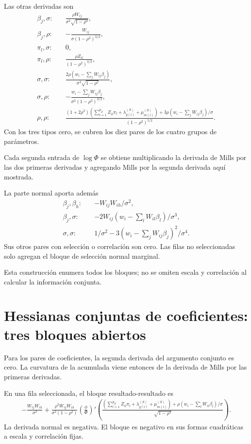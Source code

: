 \documentclass[11pt,a4paper]{article}
\begin{document}
Las otras derivadas son
\[
\begin{aligned}
\beta_j,\sigma:\quad&
\frac{\rho W_{ij}}{\sigma^2\sqrt{1-\rho^2}},\\
\beta_j,\rho:\quad&
-\frac{W_{ij}}{\sigma(1-\rho^2)^{3/2}},\\
\pi_l,\sigma:\quad&0,\\
\pi_l,\rho:\quad&
\frac{\rho Z_{il}}{(1-\rho^2)^{3/2}},\\
\sigma,\sigma:\quad&
\frac{2\rho(w_i-\sum_jW_{ij}\beta_j)}
{\sigma^3\sqrt{1-\rho^2}},\\
\sigma,\rho:\quad&
-\frac{w_i-\sum_jW_{ij}\beta_j}
{\sigma^2(1-\rho^2)^{3/2}},\\
\rho,\rho:\quad&
\frac{
(1+2\rho^2)\left(\sum_{l=1}^{p_Z}Z_{il}\pi_l+\lambda_{y(i)}^{(S)}+\mu_{m(i)}^{(S)}\right)
+3\rho(w_i-\sum_jW_{ij}\beta_j)/\sigma
}{(1-\rho^2)^{5/2}}.
\end{aligned}
\]
Con los tres tipos cero,
se cubren los diez pares
de los cuatro grupos
de parámetros.

Cada segunda entrada de
\(\log\Phi\) se obtiene
multiplicando la derivada de
Mills por las dos
primeras derivadas y agregando
Mills por la segunda
derivada aquí mostrada.

La parte normal aporta además
\[
\begin{aligned}
\beta_j,\beta_h:\quad&-W_{ij}W_{ih}/\sigma^2,\\
\beta_j,\sigma:\quad&
-2W_{ij}(w_i-\sum_lW_{il}\beta_l)/\sigma^3,\\
\sigma,\sigma:\quad&
1/\sigma^2-3(w_i-\sum_jW_{ij}\beta_j)^2/\sigma^4.
\end{aligned}
\]
Sus otros pares con
selección o correlación
son cero.
Las filas no seleccionadas
solo agregan el bloque
de selección normal marginal.

Esta construcción enumera
todos los bloques;
no se omiten escala
y correlación al
calcular la información conjunta.


\clearpage
\section{Hessianas conjuntas de coeficientes: tres bloques abiertos}

Para los pares de coeficientes,
la segunda derivada del
argumento conjunto es cero.
La curvatura de la
acumulada viene entonces
de la derivada de Mills
por las primeras derivadas.

En una fila seleccionada,
el bloque resultado-resultado es
\[
\begin{aligned}
-\frac{W_{ij}W_{ih}}{\sigma^2}
+\frac{\rho^2W_{ij}W_{ih}}{\sigma^2(1-\rho^2)}
\left(\frac{\phi}{\Phi}\right)'
\left(
\frac{\left(\sum_{l=1}^{p_Z}Z_{il}\pi_l+\lambda_{y(i)}^{(S)}+\mu_{m(i)}^{(S)}\right)+
\rho(w_i-\sum_lW_{il}\beta_l)/\sigma}
{\sqrt{1-\rho^2}}\right).
\end{aligned}
\]
La derivada normal es negativa.
El bloque es negativo
en sus formas cuadráticas
a escala y correlación fijas.
\end{document}
